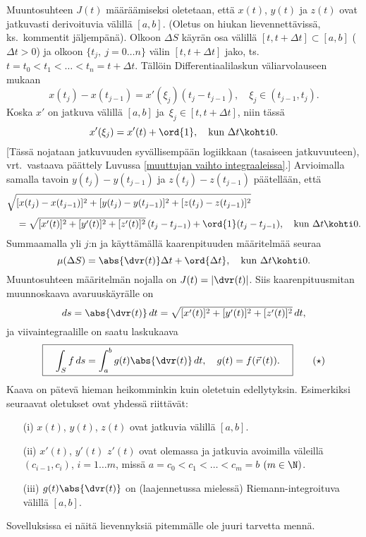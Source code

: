 Muuntosuhteen $J(t)$ määräämiseksi oletetaan, että $x(t)$, $y(t)$ ja $z(t)$ ovat jatkuvasti 
derivoituvia välillä $[a,b]$. (Oletus on hiukan lievennettävissä, ks.\ kommentit jäljempänä). 
Olkoon $\Delta S$ käyrän osa välillä $[t,t+\Delta t] \subset [a,b]$ ($\Delta t>0$) ja olkoon
$\{t_j,\ j=0 \ldots n\}$ välin $[t,t+\Delta t]$ jako, ts.\ 
$t=t_0 < t_1 < \ldots < t_n = t+\Delta t$. Tällöin Differentiaalilaskun väliarvolauseen mukaan
\[
x(t_j)-x(t_{j-1})=x'(\xi_j)(t_j-t_{j-1}),\quad \xi_j\in (t_{j-1},t_j).
\]
Koska $x'$ on jatkuva välillä $[a,b]$ ja $\,\xi_j\in[t,t+\Delta t]$, niin tässä
\[
x'(\xi_j) = x'(t) + \ord{1}, \quad \text{kun}\ \Delta t \kohti 0. 
\]
[Tässä nojataan jatkuvuuden syvällisempään logiikkaan (tasaiseen jatkuvuuteen), vrt.\ vastaava
päättely Luvussa \ref{muuttujan vaihto integraaleissa}.] Arvioimalla samalla tavoin
$y(t_j)-y(t_{j-1})$ ja $z(t_j)-z(t_{j-1})$ päätellään, että
\vspace{1mm}
\begin{align*}
&\sqrt{[x(t_j)-x(t_{j-1})]^2+[y(t_j)-y(t_{j-1})]^2+[z(t_j)-z(t_{j-1})]^2} \\[1mm]
&\quad = \sqrt{[x'(t)]^2+[y'(t)]^2 + [z'(t)]^2}\,(t_j-t_{j-1}) 
                                   + \ord{1}(t_j-t_{j-1}), \quad \text{kun}\ \Delta t \kohti 0.
\end{align*}
\vspace{1mm}
Summaamalla yli $j$:n ja käyttämällä kaarenpituuden määritelmää seuraa
\[
\mu(\Delta S)=\abs{\dvr(t)}\Delta t+\ord{\Delta t}, \quad \text{kun}\ \Delta t \kohti 0.
\]
Muuntosuhteen määritelmän nojalla on $J(t)=|\dvr(t)|$. Siis kaarenpituusmitan muunnoskaava 
avaruuskäyrälle on
\[
ds = \abs{\dvr(t)}\,dt = \sqrt{[x'(t)]^2+[y'(t)]^2+[z'(t)]^2}\,dt,
\]
ja viivaintegraalille on saatu laskukaava
\begin{equation} \label{viivaintegraalin kaava}
\boxed{\quad \int_S f\,ds=\int_a^b g(t)\abs{\dvr(t)}\,dt, \quad 
                     g(t)=f(\vec r\,(t)). \quad} \tag{$\star$}
\end{equation}
Kaava on pätevä hieman heikomminkin kuin oletetuin edellytyksin. Esimerkiksi seuraavat oletukset
ovat yhdessä riittävät:
\begin{itemize}
\item[(i)]   $x(t)$, $y(t)$, $z(t)$ ovat jatkuvia välillä $[a,b]$.
\item[(ii)]  $x'(t)$, $y'(t)$ $z'(t)$ ovat olemassa ja jatkuvia avoimilla väleillä 
             $(c_{i-1},c_i)$, $i=1\ldots m$, missä $a=c_0<c_1<\ldots<c_m=b$ $(m\in\N)$.
\item[(iii)] $g(t)\abs{\dvr(t)}$ on (laajennetussa mielessä) Riemann-integroituva välillä
             $[a,b]$.
\end{itemize}
Sovelluksissa ei näitä lievennyksiä pitemmälle ole juuri tarvetta mennä.

